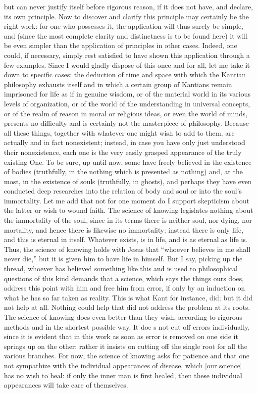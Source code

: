 but can never justify itself before rigorous reason,
if it does not have, and declare, its own principle.
Now to discover and clarify this principle may
certainly be the right work:
for one who possesses it,
the application will thus surely be simple,
and (since the most complete clarity and distinctness is
to be found here)
it will be even simpler than the
application of principles in other cases.
Indeed, one could, if necessary,
simply rest satisfied to have shown
this application through a few examples.
Since I would gladly dispose of this once and for all,
let me take it down to specific cases:
the deduction of time and space
with which the Kantian philosophy exhausts itself
and in which a certain group of Kantians remain
imprisoned for life as if in genuine wisdom,
or of the material world in its various levels of organization,
or of the world of the understanding in universal concepts,
or of the realm of reason in moral or religious ideas,
or even the world of minds,
presents no difficulty and is certainly
not the masterpiece of philosophy.
Because all these things,
together with whatever one might wish to add to them,
are actually and in fact nonexistent;
instead, in case you have only just understood their nonexistence,
each one is the very easily grasped appearance
of the truly existing One.
To be sure, up until now,
some have freely believed in the existence of bodies
(truthfully, in the nothing which is presented as nothing)
and, at the most, in the existence of souls
(truthfully, in ghosts),
and perhaps they have even conducted
deep researches into the relation of body and soul
or into the soul's immortality.
Let me add that not for one moment do I support
skepticism about the latter or wish to wound faith.
The science of knowing legislates
nothing about the immortality of the soul,
since in its terms there is
neither soul, nor dying, nor mortality,
and hence there is likewise no immortality;
instead there is only life,
and this is eternal in itself.
Whatever exists, is in life,
and is as eternal as life is.
Thus, the science of knowing holds with Jesus that
“whoever believes in me shall never die,”
but it is given him to have life in himself.
But I say, picking up the thread,
whoever has believed something like this
and is used to philosophical questions of this kind
demands that a science, which says the things ours does,
address this point with him and free him from error,
if only by an induction on what he has so far taken as reality.
This is what Kant for instance, did;
but it did not help at all.
Nothing could help that did not address the problem at its roots.
The science of knowing does even better than they wish,
according to rigorous methods and in the shortest possible way.
It doe s not cut off errors individually,
since it is evident that in this work
as soon as error is removed on one side
it springs up on the other;
rather it insists on cutting off
the single root for all the various branches.
For now, the science of knowing asks for patience
and that one not sympathize with
the individual appearances of disease,
which [our science] has no wish to heal:
if only the inner man is first healed,
then these individual appearances
will take care of themselves.

